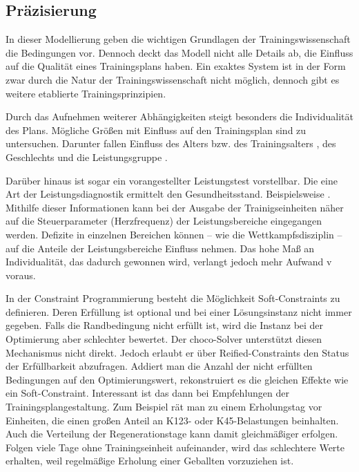 \subsection{Präzisierung}
In dieser Modellierung geben die wichtigen Grundlagen der Trainingswissenschaft die Bedingungen vor. Dennoch deckt das Modell nicht alle Details ab, die Einfluss auf die Qualität eines Trainingsplans haben. Ein exaktes System ist in der Form zwar durch die Natur der Trainingswissenschaft nicht möglich, dennoch gibt es weitere etablierte Trainingsprinzipien. \par
Durch das Aufnehmen weiterer Abhängigkeiten steigt besonders die Individualität des Plans. Mögliche Größen mit Einfluss auf den Trainingsplan sind zu untersuchen. Darunter fallen Einfluss des Alters bzw. des Trainingsalters \cite[181]{EinfuerungTrainingswissenschaft}, des Geschlechts und die Leistungsgruppe \cite[S. 173]{Radsporttraining}.\par
Darüber hinaus ist sogar ein vorangestellter Leistungstest vorstellbar. Die eine Art der Leistungsdiagnostik ermittelt den Gesundheitsstand. Beispielsweise . Mithilfe dieser Informationen kann bei der Ausgabe der Trainigseinheiten näher auf die Steuerparameter (Herzfrequenz) der Leistungsbereiche eingegangen werden.  Defizite in einzelnen Bereichen können --  wie die Wettkampfsdisziplin -- auf die Anteile der Leistungsbereiche Einfluss nehmen. Das hohe Maß an Individualität, das dadurch gewonnen wird, verlangt jedoch mehr Aufwand v voraus. \par
In der Constraint Programmierung besteht die Möglichkeit Soft-Constraints zu definieren. Deren Erfüllung ist optional und bei einer Lösungsinstanz nicht immer gegeben. Falls die Randbedingung nicht erfüllt ist, wird die Instanz bei der Optimierung aber schlechter bewertet. Der choco-Solver unterstützt diesen Mechanismus nicht direkt. Jedoch erlaubt er über Reified-Constraints den Status der Erfüllbarkeit abzufragen. Addiert man die Anzahl der nicht erfüllten Bedingungen auf den Optimierungswert, rekonstruiert es die gleichen Effekte wie ein Soft-Constraint. Interessant ist das dann bei Empfehlungen der Trainingsplangestaltung. Zum Beispiel rät man zu einem Erholungstag vor Einheiten, die einen großen Anteil an K123- oder K45-Belastungen beinhalten. Auch die Verteilung der Regenerationstage kann damit gleichmäßiger erfolgen. Folgen viele Tage ohne Trainingseinheit aufeinander, wird das schlechtere Werte erhalten, weil regelmäßige Erholung einer Geballten vorzuziehen ist.
   
